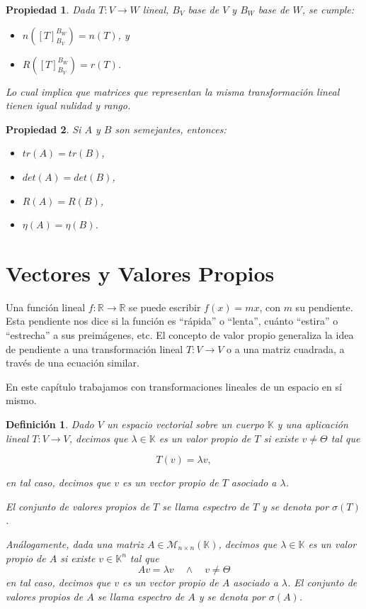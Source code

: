 \documentclass[12pt]{book}
\newtheorem{defi}{Definici\'on}
\newtheorem{prop}{Propiedad}
\def\K{\mathbb{K}}
\begin{document}
\begin{prop}
Dada $T:V\rightarrow W$ lineal, $B_V$ base de $V$ y $B_W$ base de $W$, se cumple:
\begin{itemize}
\item $n([T]_{B_V}^{B_W})=n(T)$, y
\item $R([T]_{B_V}^{B_W})=r(T)$.
\end{itemize}
Lo cual implica que matrices que representan la misma transformación lineal tienen igual nulidad y rango.
\end{prop}

\begin{prop}
Si $A$ y $B$ son semejantes, entonces:
\begin{itemize}
\item $tr(A)=tr(B)$,
\item $det(A)=det(B)$,
\item $R(A)=R(B)$,
\item $\eta(A)=\eta(B)$.
\end{itemize}
\end{prop}



\section{Vectores y Valores Propios}

Una función lineal $f:\mathbb{R}\rightarrow\mathbb{R}$ se puede escribir $f(x)=mx$, con $m$ su pendiente. Esta pendiente nos dice si la función es ``rápida'' o ``lenta'', cuánto ``estira'' o ``estrecha'' a sus preimágenes, etc.
El concepto de valor propio generaliza la idea de pendiente a una transformación lineal $T:V\rightarrow V$ o a una matriz cuadrada, a través de una ecuación similar.

En este capítulo trabajamos con transformaciones lineales de un espacio en sí mismo.

\begin{defi}\label{def:vvp}
Dado $V$ un espacio vectorial sobre un cuerpo $\K$ y una aplicación lineal $T:V\rightarrow V$, decimos que $\lambda\in\K$ es un \emph{valor propio} de $T$ si existe $v\not =\Theta$ tal que

$$ T(v)=\lambda v,$$

en tal caso, decimos que $v$ es un \emph{vector propio} de $T$ asociado a $\lambda$.

El conjunto de valores propios de $T$ se llama \emph{espectro} de $T$ y se denota por $\sigma(T)$.

Análogamente,  dada una matriz $A\in\mathcal{M}_{n\times n}(\K)$, decimos que $\lambda\in\K$ es un \emph{valor propio} de $A$ si existe $v\in\K^n$ tal que
$$ Av=\lambda v\quad \wedge\quad v\not =\Theta$$
en tal caso, decimos que $v$ es un \emph{vector propio} de $A$ asociado a $\lambda$. El conjunto de valores propios de $A$ se llama \emph{espectro} de $A$ y se denota por $\sigma(A)$.

\end{defi}
\end{document}
